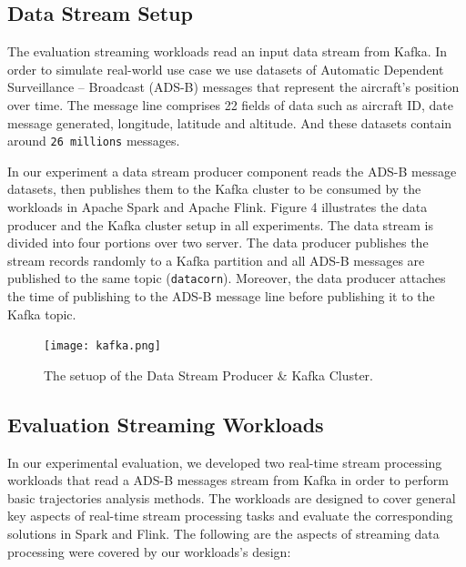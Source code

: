 \documentclass[]{article}
\begin{document}
\subsection{Data Stream Setup}
The evaluation streaming workloads read an input data stream from Kafka. In order to simulate real-world use case we use datasets of Automatic Dependent Surveillance – Broadcast (ADS-B) messages that represent the aircraft's position over time. The message line comprises 22 fields of data such as aircraft ID, date message generated, longitude, latitude and altitude.  And  these datasets contain around \texttt{26 millions} messages.  
\par In our experiment a data stream producer component reads the ADS-B message datasets, then publishes them to the Kafka cluster to be consumed by the workloads in Apache Spark and Apache Flink. Figure 4 illustrates the data producer and the Kafka cluster setup in all experiments.
The data stream is divided into four portions over two server. The data producer publishes the stream records randomly to a Kafka partition and all ADS-B messages are published to the same topic (\texttt{datacorn}). Moreover, the data producer attaches the time of publishing to the ADS-B message line before publishing it to the Kafka topic.

\begin{figure}[h]
 
  \centering
    \texttt{[image: kafka.png]}
     \caption{The setuop of the Data Stream Producer \& Kafka Cluster.}
\end{figure} 

\newpage
\subsection{Evaluation Streaming Workloads}
In our experimental evaluation, we developed two real-time stream processing workloads that read a ADS-B messages stream from Kafka in order to perform basic trajectories analysis methods. The workloads are designed to cover general key aspects of real-time stream processing tasks and evaluate the corresponding solutions in Spark and Flink. The following are the aspects of streaming data processing were covered by our workloads's design: 
\end{document}
